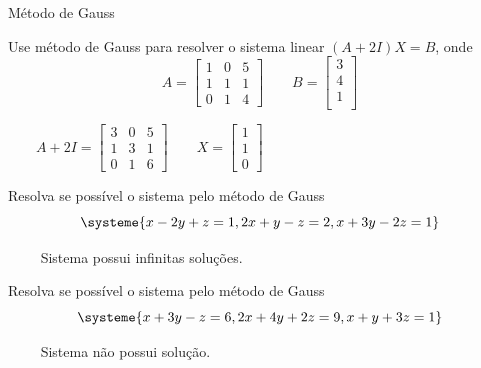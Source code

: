 \begin{exercicios}{Método de Gauss}
    \begin{exercicio}
        Use método de Gauss para resolver o sistema linear $(A+2I)X=B$, onde
        \[A = \left[ \begin{array}{rrr}
        1 & 0 & 5 \\
        1 & 1 & 1 \\
        0 & 1 & 4
        \end{array} \right] 
        \qquad
        B = \left[ \begin{array}{r} 3 \\ 4 \\ 1 \\ \end{array}
        \right] 
        \]
        \begin{answers}
            \(
            \qquad A+2I = \left[
            \begin{array}{rrr}
            3 & 0 & 5 \\
            1 & 3 & 1 \\
            0 & 1 & 6
            \end{array}
            \right]
            \qquad X = \left[
            \begin{array}{r}
            1 \\
            1 \\
            0
            \end{array}
            \right]
            \)
        \end{answers}
    \end{exercicio}
            
    \begin{exercicio}
        Resolva se possível o sistema pelo método de Gauss
        \[\systeme{ x - 2y +  z = 1,
                   2x +  y -  z = 2,
                    x + 3y - 2z = 1}
        \]
        \begin{answers}
            \(\qquad\) Sistema possui infinitas soluções.
        \end{answers}
    \end{exercicio}
    
    \begin{exercicio}
        Resolva se possível o sistema pelo método de Gauss
        \[\systeme{ x + 3y -  z = 6,
                   2x + 4y + 2z = 9,
                    x +  y + 3z = 1}
        \]
        \begin{answers}
            \(\qquad\) Sistema não possui solução.
        \end{answers}
    \end{exercicio}
    

\end{exercicios}
